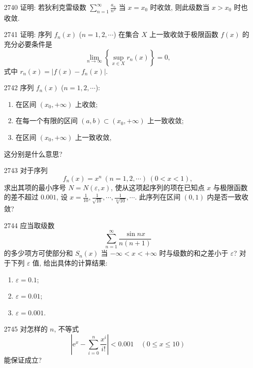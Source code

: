 \begin{prob}[M]{2740}
证明: 若狄利克雷级数 $\sum_{n=1}^{\infty} \frac{a_n}{n^x}$ 当 $x=x_0$ 时收敛, 则此级数当 $x > x_0$ 时也收敛.
\end{prob}

\begin{prob}[M]{2741}
证明: 序列 $f_n(x)$ ($n=1,2,\cdots$) 在集合 $X$ 上一致收敛于极限函数 $f(x)$ 的充分必要条件是
\[
\lim_{n\to\infty} \left\{\sup_{x\in X} r_n(x)\right\} = 0,
\]
式中 $r_n(x) = |f(x)-f_n(x)|$.
\end{prob}

\begin{prob}[L]{2742}
序列 $f_n(x)$ ($n=1,2,\cdots$):
\begin{enumerate}[label=(\alph*), itemsep=2pt, topsep=3pt]
\item 在区间 $(x_0, +\infty)$ 上收敛;
\item 在每一个有限的区间 $(a,b) \subset (x_0, +\infty)$ 上一致收敛;
\item 在区间 $(x_0, +\infty)$ 上一致收敛,
\end{enumerate}
这分别是什么意思?
\end{prob}

\begin{prob}[M]{2743}
对于序列
\[
f_n(x) = x^n \ (n=1,2,\cdots) \ (0 < x < 1),
\]
求出其项的最小序号 $N=N(\varepsilon, x)$, 使从这项起序列的项在已知点 $x$ 与极限函数的差不超过 $0.001$, 设 $x = \frac{1}{10}, \frac{1}{\sqrt{10}}, \cdots, \frac{1}{\sqrt[m]{10}}, \cdots$. 此序列在区间 $(0,1)$ 内是否一致收敛?
\end{prob}

\begin{prob}[L]{2744}
应当取级数
\[
\sum_{n=1}^{\infty} \frac{\sin nx}{n(n+1)}
\]
的多少项方可使部分和 $S_n(x)$ 当 $-\infty < x < +\infty$ 时与级数的和之差小于 $\varepsilon$? 对于下列 $\varepsilon$ 值, 给出具体的计算结果:
\begin{enumerate}[label=(\alph*), itemsep=2pt, topsep=3pt]
\item $\varepsilon = 0.1$;
\item $\varepsilon = 0.01$;
\item $\varepsilon = 0.001$.
\end{enumerate}
\end{prob}

\begin{prob}[M]{2745}
对怎样的 $n$, 不等式
\[
\left|\mathrm{e}^x - \sum_{i=0}^{n} \frac{x^i}{i!}\right| < 0.001 \quad (0 \leqslant x \leqslant 10)
\]
能保证成立?
\end{prob}

